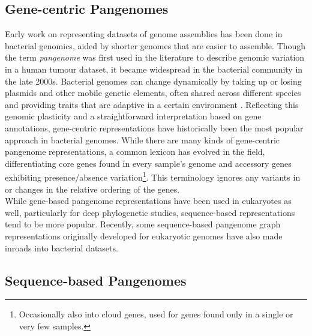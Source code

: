 \subsection*{Gene-centric Pangenomes}
Early work on representing datasets of genome assemblies has been done in bacterial genomics, aided by shorter genomes that are easier to assemble\cite{sanderson23, matthews24, rojas-miranda25}.
Though the term \emph{pangenome} was first used in the literature to describe genomic variation in a human tumour dataset, it became widespread in the bacterial community in the late 2000s\cite{sigaux00, matthews24}.
Bacterial genomes can change dynamically by taking up or losing plasmids and other mobile genetic elements, often shared across different species and providing traits that are adaptive in a certain environment \cite{bottery22, rodriguez-beltran21}. %
Reflecting this genomic plasticity and a straightforward interpretation based on gene annotations, gene-centric representations have historically been the most popular approach in bacterial genomes\cite{matthews24}.
While there are many kinds of gene-centric pangenome representations, a common lexicon has evolved in the field, differentiating core genes found in every sample's genome and accessory genes exhibiting presence/absence variation\footnote{Occasionally also into cloud genes, used for genes found only in a single or very few samples.}\cite{matthews24}.
This terminology ignores any variants in or changes in the relative ordering of the genes.\\
While gene-based pangenome representations have been used in eukaryotes as well, particularly for deep phylogenetic studies\cite{lovell22, matthews24}, sequence-based representations tend to be more popular. %
Recently, some sequence-based pangenome graph representations originally developed for eukaryotic genomes have also made inroads into bacterial datasets\cite{noll23, canalda-baltrons25}.

\subsection*{Sequence-based Pangenomes}

